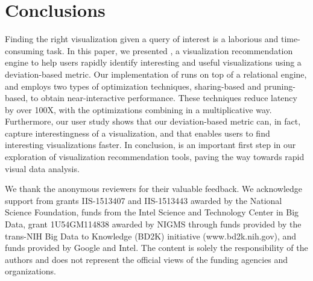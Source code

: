 
\section{Conclusions}
\label{sec:conc}

Finding the right visualization given a query of interest is a
laborious and time-consuming task.
In this paper, we presented \SeeDB, a visualization recommendation
engine to help users 
rapidly identify interesting and useful visualizations using a deviation-based 
metric.
Our implementation of \SeeDB runs on top of a relational engine, and employs two types of optimization 
techniques, sharing-based and pruning-based, to obtain near-interactive performance.
These techniques reduce latency by over 100X, with the optimizations combining in a multiplicative way. 
Furthermore, our user study shows that our deviation-based metric can, in fact, capture interestingness of a 
visualization, and that \SeeDB enables users to find interesting visualizations faster.
In conclusion, \SeeDB is an important first step in our exploration of 
visualization recommendation tools, 
paving the way towards rapid visual data analysis.

We thank the anonymous reviewers for their valuable feedback. We acknowledge support from grants IIS-1513407 and IIS-1513443 awarded by the National Science Foundation, funds from the Intel Science and Technology Center in Big Data, 
grant 1U54GM114838 awarded by NIGMS through funds provided by the trans-NIH Big Data to Knowledge (BD2K) initiative \break 
(www.bd2k.nih.gov), and funds provided by Google and Intel. The content is solely the responsibility of the authors and does not represent the official views of the funding agencies and organizations.

